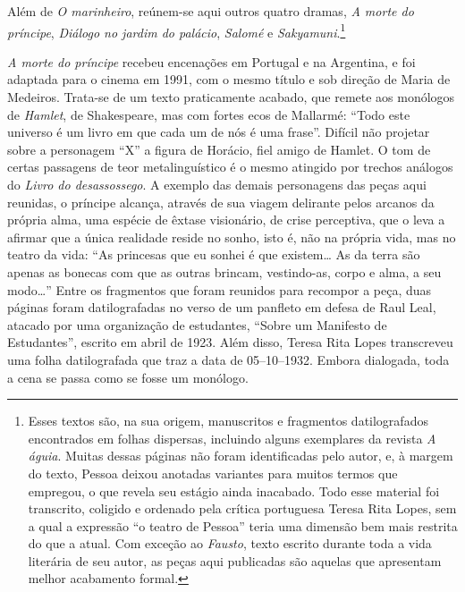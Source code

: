 Além de \textit{O marinheiro}, reúnem-se aqui outros quatro dramas,
\textit{A morte do príncipe}, \textit{Diálogo no jardim do
palácio}, \textit{Salomé} e \textit{Sakyamuni}.\footnote{ Esses textos
são, na sua origem, manuscritos e fragmentos datilografados encontrados em folhas dispersas,
incluindo alguns exemplares da revista \textit{A águia}. 
Muitas dessas páginas não foram identificadas pelo autor, e, à margem do texto, 
Pessoa deixou anotadas variantes para muitos termos que empregou, o que revela seu estágio ainda
inacabado.
Todo esse material foi transcrito, coligido e ordenado pela
crítica portuguesa Teresa Rita Lopes, sem a qual a expressão “o teatro
de Pessoa” teria uma dimensão bem mais restrita do que a atual. Com
exceção ao \textit{Fausto}, texto escrito durante toda a vida literária
de seu autor, as peças aqui publicadas são aquelas que apresentam
melhor acabamento formal.}

\textit{A morte do príncipe} recebeu encenações em Portugal e na
Argentina, e foi adaptada para o cinema em 1991, com o mesmo título e
sob direção de Maria de Medeiros. Trata-se de um texto praticamente
acabado, que remete aos monólogos de \textit{Hamlet}, de Shakespeare,
mas com fortes ecos de Mallarmé: “Todo este universo é um livro em que
cada um de nós é uma frase”. Difícil não projetar sobre a personagem
“X” a figura de Horácio, fiel amigo de Hamlet. O tom de certas
passagens de teor metalinguístico é o mesmo atingido por trechos
análogos do \textit{Livro do desassossego}. A exemplo das demais
personagens das peças aqui reunidas, o príncipe alcança, através de sua
viagem delirante pelos arcanos da própria alma, uma espécie de êxtase
visionário, de crise perceptiva, que o leva a afirmar que a única
realidade reside no sonho, isto é, não na própria vida, mas no teatro
da vida: “As princesas que eu sonhei é que existem\ldots{} As da terra são
apenas as bonecas com que as outras brincam, vestindo-as, corpo e alma,
a seu modo\ldots{}”
Entre os fragmentos que foram reunidos para recompor a peça, duas páginas foram
datilografadas no verso de um panfleto em defesa de Raul Leal, atacado por uma organização 
de estudantes, ``Sobre um Manifesto de Estudantes'', escrito em 
abril de 1923. Além disso, Teresa Rita Lopes transcreveu uma folha datilografada
que traz a data de 05--10--1932.
Embora dialogada, toda a cena se passa como se fosse um
monólogo.

